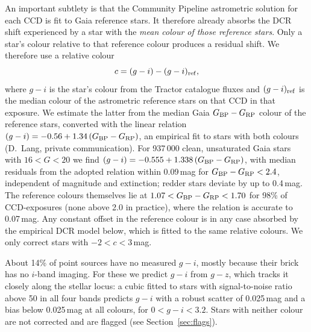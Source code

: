 \documentclass[usenatbib]{mnras}   %
\begin{document}
An important subtlety is that the Community Pipeline astrometric solution for each CCD is fit to Gaia reference stars. It therefore already absorbs the DCR shift experienced by a star with the \emph{mean colour of those reference stars}. Only a star's colour relative to that reference colour produces a residual shift. We therefore use a relative colour
\begin{equation}
    c = (g - i) - (g - i)_{\rm ref},
\end{equation}
where $g-i$ is the star's colour from the Tractor catalogue fluxes and $(g-i)_{\rm ref}$ is the median colour of the astrometric reference stars on that CCD in that exposure. We estimate the latter from the median Gaia $G_{\rm BP} - G_{\rm RP}$ colour of the reference stars, converted with the linear relation $(g-i) = -0.56 + 1.34\,(G_{\rm BP}-G_{\rm RP})$, an empirical fit to stars with both colours (D.~Lang, private communication). For 937\,000 clean, unsaturated Gaia stars with $16 < G < 20$ we find $(g-i) = -0.555 + 1.338\,(G_{\rm BP}-G_{\rm RP})$, with median residuals from the adopted relation within 0.09\,mag for $G_{\rm BP}-G_{\rm RP} < 2.4$, independent of magnitude and extinction; redder stars deviate by up to 0.4\,mag. The reference colours themselves lie at $1.07 < G_{\rm BP}-G_{\rm RP} < 1.70$ for 98\% of CCD-exposures (none above 2.0 in practice), where the relation is accurate to 0.07\,mag. Any constant offset in the reference colour is in any case absorbed by the empirical DCR model below, which is fitted to the same relative colours. We only correct stars with $-2 < c < 3$\,mag.

About 14\% of point sources have no measured $g-i$, mostly because their brick has no $i$-band imaging. For these we predict $g-i$ from $g-z$, which tracks it closely along the stellar locus: a cubic fitted to stars with signal-to-noise ratio above 50 in all four bands predicts $g-i$ with a robust scatter of 0.025\,mag and a bias below 0.025\,mag at all colours, for $0 < g-i < 3.2$. Stars with neither colour are not corrected and are flagged (see Section~\ref{sec:flags}).
\end{document}

